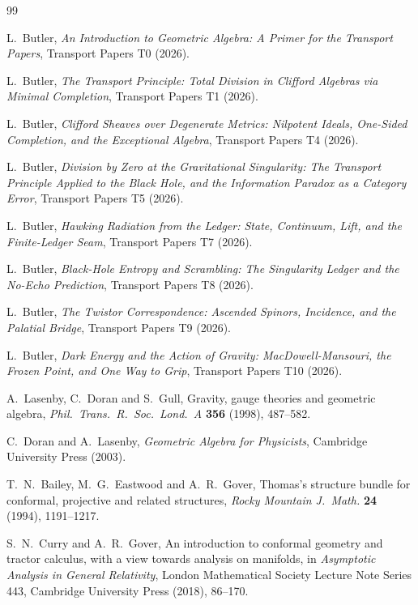 \documentclass[11pt]{article}
\theoremstyle{definition}
\begin{document}
\begin{thebibliography}{99}

L.~Butler,
\emph{An Introduction to Geometric Algebra: A Primer for the Transport Papers},
Transport Papers T0 (2026).

L.~Butler,
\emph{The Transport Principle: Total Division in Clifford Algebras via Minimal Completion},
Transport Papers T1 (2026).

L.~Butler,
\emph{Clifford Sheaves over Degenerate Metrics: Nilpotent Ideals, One-Sided Completion, and the Exceptional Algebra},
Transport Papers T4 (2026).

L.~Butler,
\emph{Division by Zero at the Gravitational Singularity: The Transport Principle Applied to the Black Hole, and the Information Paradox as a Category Error},
Transport Papers T5 (2026).

L.~Butler,
\emph{Hawking Radiation from the Ledger: State, Continuum, Lift, and the Finite-Ledger Seam},
Transport Papers T7 (2026).

L.~Butler,
\emph{Black-Hole Entropy and Scrambling: The Singularity Ledger and the No-Echo Prediction},
Transport Papers T8 (2026).

L.~Butler,
\emph{The Twistor Correspondence: Ascended Spinors, Incidence, and the Palatial Bridge},
Transport Papers T9 (2026).

L.~Butler,
\emph{Dark Energy and the Action of Gravity: MacDowell-Mansouri, the Frozen Point, and One Way to Grip},
Transport Papers T10 (2026).

A.~Lasenby, C.~Doran and S.~Gull,
Gravity, gauge theories and geometric algebra,
\emph{Phil.\ Trans.\ R.\ Soc.\ Lond.\ A} \textbf{356} (1998), 487--582.

C.~Doran and A.~Lasenby,
\emph{Geometric Algebra for Physicists},
Cambridge University Press (2003).

T.~N.~Bailey, M.~G.~Eastwood and A.~R.~Gover,
Thomas's structure bundle for conformal, projective and related structures,
\emph{Rocky Mountain J.\ Math.} \textbf{24} (1994), 1191--1217.

S.~N.~Curry and A.~R.~Gover,
An introduction to conformal geometry and tractor calculus, with a view towards analysis on manifolds,
in \emph{Asymptotic Analysis in General Relativity},
London Mathematical Society Lecture Note Series 443, Cambridge University Press (2018), 86--170.


\end{thebibliography}
\end{document}
